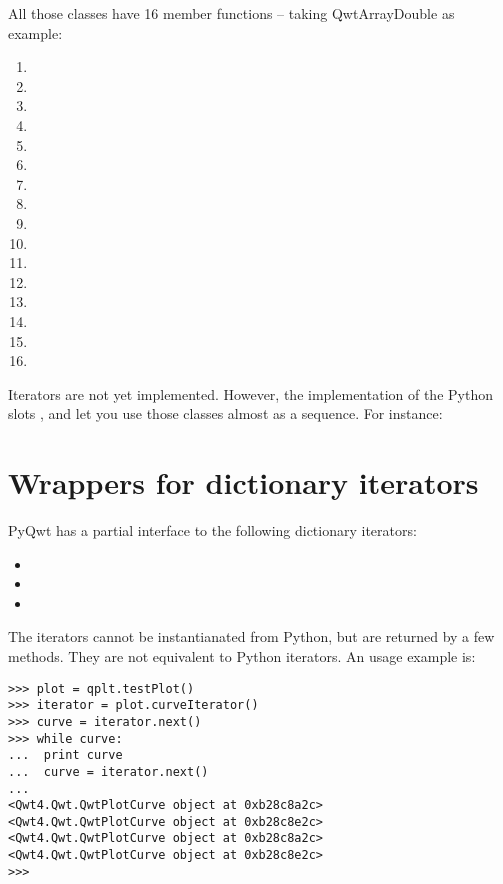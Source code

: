 \documentclass{manual}
\begin{document}
All those classes have 16 member functions -- taking QwtArrayDouble as example:
\begin{enumerate}
\item
\item
\item
\item
\item
\item
\item
\item
\item
\item
\item
\item
\item
\item
\item
\item
\end{enumerate}

Iterators are not yet implemented. However, the implementation of the
Python slots ,  and
 let you use those classes almost as a sequence.
For instance:



\section{Wrappers for dictionary iterators \label{dictit}}

PyQwt has a partial interface to the following dictionary iterators:
\begin{itemize}
\item
\item
\item
\end{itemize}

The iterators cannot be instantianated from Python, but are returned by a few
methods.  They are not equivalent to Python iterators.  An usage example is:
\begin{verbatim}
>>> plot = qplt.testPlot()
>>> iterator = plot.curveIterator()
>>> curve = iterator.next()
>>> while curve:
...  print curve
...  curve = iterator.next()
...
<Qwt4.Qwt.QwtPlotCurve object at 0xb28c8a2c>
<Qwt4.Qwt.QwtPlotCurve object at 0xb28c8e2c>
<Qwt4.Qwt.QwtPlotCurve object at 0xb28c8a2c>
<Qwt4.Qwt.QwtPlotCurve object at 0xb28c8e2c>
>>>
\end{verbatim}
\end{document}

